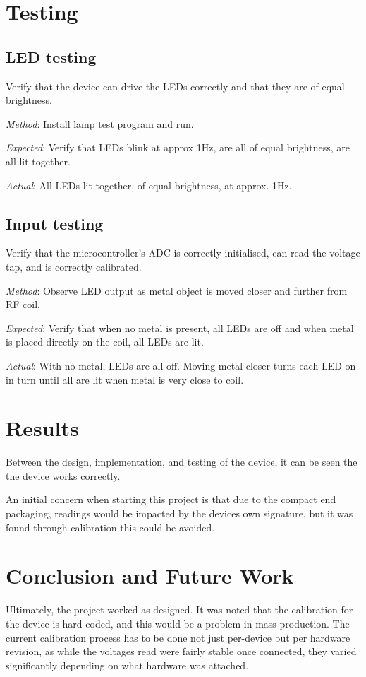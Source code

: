 \documentclass[a4paper]{article}
\begin{document}
    \section{Testing}
        \subsection{LED testing}
        Verify that the device can drive the LEDs correctly and that they are of equal brightness.
        
        \emph{Method}:
        Install lamp test program and run.

        \emph{Expected}:
        Verify that LEDs blink at approx 1Hz, are all of equal brightness, are all lit together.

        \emph{Actual}:
        All LEDs lit together, of equal brightness, at approx. 1Hz.

        \subsection{Input testing}
        Verify that the microcontroller's ADC is correctly initialised, can read the voltage tap, and is correctly calibrated.
        
        \emph{Method}:
        Observe LED output as metal object is moved closer and further from RF coil.

        \emph{Expected}:
        Verify that when no metal is present, all LEDs are off and when metal is placed directly on the coil, all LEDs are lit.

        \emph{Actual}:
        With no metal, LEDs are all off. Moving metal closer turns each LED on in turn until all are lit when metal is very close to coil.

    \section{Results}
    Between the design, implementation, and testing of the device, it can be seen the the device works correctly.

    An initial concern when starting this project is that due to the compact end packaging, readings would be impacted by the devices own signature, but it was found through calibration this could be avoided.

    \section{Conclusion and Future Work}
    Ultimately, the project worked as designed. It was noted that the calibration for the device is hard coded, and this would be a problem in mass production. The current calibration process has to be done not just per-device but per hardware revision, as while the voltages read were fairly stable once connected, they varied significantly depending on what hardware was attached.
\end{document}
